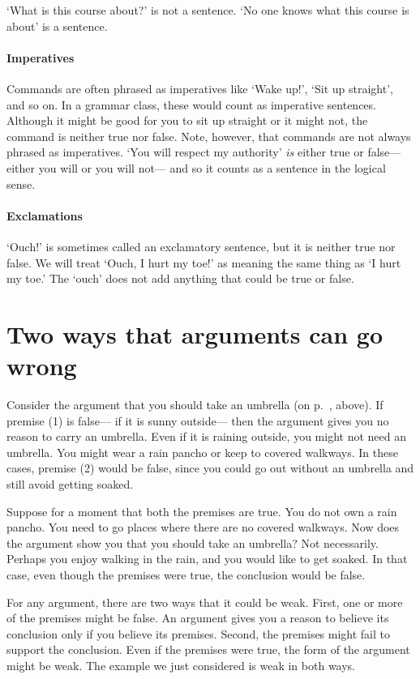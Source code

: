 `What is this course about?' is not a sentence. `No one knows what this course is about' is a sentence.

\paragraph{Imperatives} Commands are often phrased as imperatives like `Wake up!', `Sit up straight', and so on. In a grammar class, these would count as imperative sentences. Although it might be good for you to sit up straight or it might not, the command is neither true nor false. Note, however, that commands are not always phrased as imperatives. `You will respect my authority' \emph{is} either true or false--- either you will or you will not--- and so it counts as a sentence in the logical sense.

\paragraph{Exclamations} `Ouch!' is sometimes called an exclamatory sentence, but it is neither true nor false. We will treat `Ouch, I hurt my toe!' as meaning the same thing as `I hurt my toe.' The `ouch' does not add anything that could be true or false.




\section{Two ways that arguments can go wrong}
Consider the argument that you should take an umbrella (on p.~\pageref{argRaining}, above). If premise (1) is false--- if it is sunny outside--- then the argument gives you no reason to carry an umbrella. Even if it is raining outside, you might not need an umbrella. You might wear a rain pancho or keep to covered walkways. In these cases, premise (2) would be false, since you could go out without an umbrella and still avoid getting soaked.

Suppose for a moment that both the premises are true. You do not own a rain pancho. You need to go places where there are no covered walkways. Now does the argument show you that you should take an umbrella? Not necessarily. Perhaps you enjoy walking in the rain, and you would like to get soaked. In that case, even though the premises were true, the conclusion would be false.

For any argument, there are two ways that it could be weak. First, one or more of the premises might be false. An argument gives you a reason to believe its conclusion only if you believe its premises. Second, the premises might fail to support the conclusion. Even if the premises were true, the form of the argument might be weak. The example we just considered is weak in both ways.

